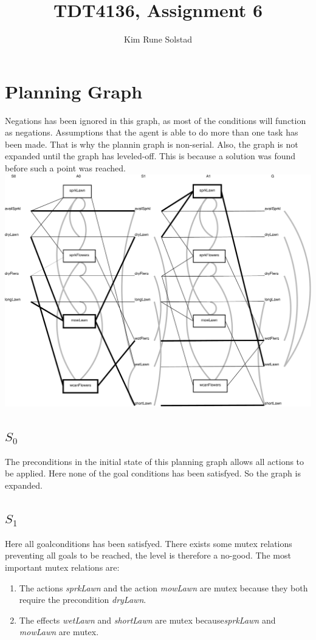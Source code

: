 \documentclass[english, a4paper]{article}
\author{Kim Rune Solstad}
\title{TDT4136, Assignment 6}
\begin{document}
\maketitle
\section{Planning Graph}
Negations has been ignored in this graph, as most of the conditions will function as negations. Assumptions that the agent is able to do more than one task has been made. That is why the plannin graph is non-serial. Also, the graph is not expanded until the graph has leveled-off. This is because a solution was found before such a point was reached.
\\
\includegraphics[scale=0.25]{non_serial.pdf}
\subsection{$S_0$}
The preconditions in the initial state of this planning graph allows all actions to be applied. Here none of the goal conditions has been satisfyed. So the graph is expanded.

\subsection{$S_1$}
Here all goalconditions has been satisfyed. There exists some mutex relations preventing all goals to be reached, the level is therefore a no-good. The most important mutex relations are: 

\begin{enumerate}

\item The actions \emph{sprkLawn} and the action \emph{mowLawn} are mutex because they both require the precondition \emph{dryLawn}.
\item The effects \emph{wetLawn} and \emph{shortLawn} are mutex because\emph{sprkLawn} and \emph{mowLawn} are mutex. 

\end{enumerate}
\end{document}

